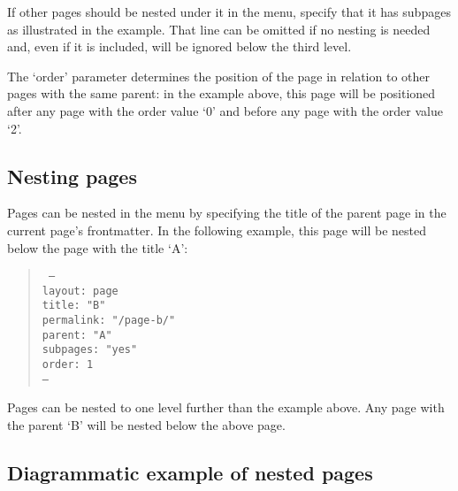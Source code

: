 If other pages should be nested under it in the menu, specify that it has subpages as illustrated in the example. That line can be omitted if no nesting is needed and, even if it is included, will be ignored below the third level.

The `order' parameter determines the position of the page in relation to other pages with the same parent: in the example above, this page will be positioned after any page with the order value `0' and before any page with the order value `2'.

\subsection{Nesting pages}

Pages can be nested in the menu by specifying the title of the parent page in the current page's frontmatter. In the following example, this page will be nested below the page with the title `A':

\begin{quote}
  \texttt{%
    ---\\
    layout: page\\
    title: "B"\\
    permalink: "/page-b/"\\
    parent: "A"\\
    subpages: "yes"\\
    order: 1\\
    ---\\
  }
\end{quote}

Pages can be nested to one level further than the example above. Any page with the parent `B' will be nested below the above page.

\subsection{Diagrammatic example of nested pages}

